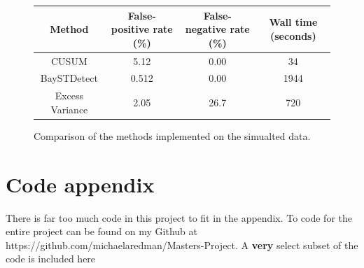 \documentclass[11pt]{report}
\begin{document}
\bgroup
\def\arraystretch{1.5}%
\begin{figure}
\centering
\begin{tabular}{| c | c | c | c |}
\hline
Method & False-positive rate (\%) & False-negative rate (\%) & Wall time (seconds) \\ \hline
CUSUM & 5.12 & 0.00 & 34 \\ \hline
BaySTDetect & 0.512 & 0.00 & 1944 \\ \hline
Excess Variance & 2.05 & 26.7 & 720 \\
\hline
\end{tabular}
\label{fig:table}
\caption{Comparison of the methods implemented on the simualted data.}
\end{figure}
\egroup

\chapter{Code appendix}

There is far too much code in this project to fit in the appendix. To code for the entire project can be found on my Github at https://github.com/michaelaredman/Masters-Project. A \textbf{very} select subset of the code is included here
\end{document}
